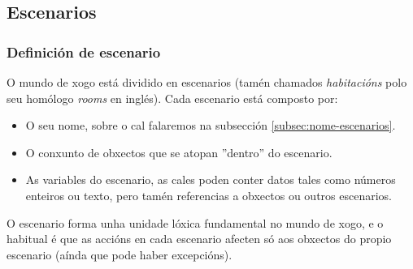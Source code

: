 \subsection{Escenarios}
\subsubsection{Definición de escenario}
O mundo de xogo está dividido en escenarios (tamén chamados {\it habitacións}
polo seu homólogo {\it rooms} en inglés). Cada escenario está composto por:
\begin{itemize}
  \item O seu nome, sobre o cal falaremos na subsección
  \ref{subsec:nome-escenarios}.
  \item O conxunto de obxectos que se atopan ''dentro'' do escenario.
  \item As variables do escenario, as cales poden conter datos tales como
  números enteiros ou texto, pero tamén referencias a obxectos ou outros
  escenarios.
\end{itemize}
\par
O escenario forma unha unidade lóxica fundamental no mundo de xogo, e o habitual
é que as accións en cada escenario afecten só aos obxectos do propio escenario
(aínda que pode haber excepcións).

